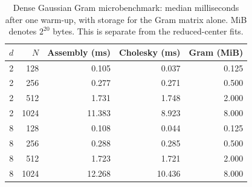 \begin{table}[htbp]
\centering\small
\caption{Dense Gaussian Gram microbenchmark: median milliseconds after one warm-up, with storage for the Gram matrix alone. MiB denotes $2^{20}$ bytes. This is separate from the reduced-center fits.}\label{tab:dense}
\begin{tabular}{@{}rrrrr@{}}
\toprule
$d$ & $N$ & Assembly (ms) & Cholesky (ms) & Gram (MiB)\\
\midrule
2 & 128 & 0.105 & 0.037 & 0.125\\
2 & 256 & 0.277 & 0.271 & 0.500\\
2 & 512 & 1.731 & 1.748 & 2.000\\
2 & 1024 & 11.383 & 8.923 & 8.000\\
8 & 128 & 0.108 & 0.044 & 0.125\\
8 & 256 & 0.288 & 0.285 & 0.500\\
8 & 512 & 1.723 & 1.721 & 2.000\\
8 & 1024 & 12.268 & 10.436 & 8.000\\
\bottomrule
\end{tabular}
\end{table}

